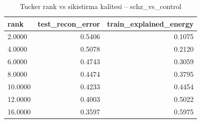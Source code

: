 \begin{table}[htbp]
  \centering
  \caption{Tucker rank vs sikistirma kalitesi -- schz\_vs\_control}
  \label{tab:compression_schz_vs_control}
  \small
  \begin{tabular}{lrr}
    \toprule
    rank & test\_recon\_error & train\_explained\_energy \\
    \midrule
    2.0000 & 0.5406 & 0.1075 \\
    4.0000 & 0.5078 & 0.2120 \\
    6.0000 & 0.4743 & 0.3059 \\
    8.0000 & 0.4474 & 0.3795 \\
    10.0000 & 0.4233 & 0.4454 \\
    12.0000 & 0.4003 & 0.5022 \\
    16.0000 & 0.3597 & 0.5975 \\
    \bottomrule
  \end{tabular}
\end{table}
